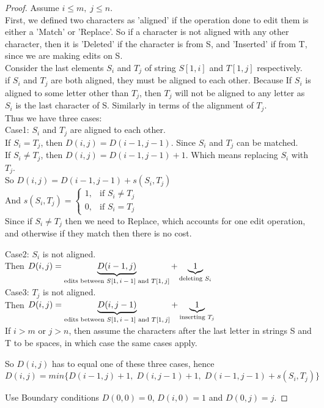 \documentclass{article}
\begin{document}
	\begin{proof}
		Assume $ i \leq m, \; j \leq n $. \\
		
		First, we defined two characters as 'aligned' if the operation done to edit them is either a 'Match' or 'Replace'. So if a character is not aligned with any other character, then it is 'Deleted' if the character is from S, and 'Inserted' if from T, since we are making edits on S.\\
		
		Consider the last elements $ S_i $ and $ T_j $ of string $ S[1, i] $ and $ T[1, j] $ respectively.\\
		if $ S_i $ and $ T_j $ are both aligned, they must be aligned to each other. Because If $ S_i $ is aligned to some letter other than $ T_j $, then $ T_j $ will not be aligned to any letter as $ S_i $ is the last character of S. Similarly in terms of the alignment of $ T_j $.\\
		Thus we have three cases:\\
		
		Case1: $ S_i $ and $ T_j $ are aligned to each other.\\
		If $ S_i = T_j $, then $ D(i, j) = D(i-1, j-1) $. Since $ S_i $ and $ T_j $ can be matched.\\
		If $ S_i \neq T_j $, then $ D(i, j) = D(i-1, j-1) + 1 $. Which means replacing $ S_i $ with $ T_j $.\\
		So $ D(i, j) = D(i-1, j-1) + s(S_i, T_j) $\\
		And $ s(S_i, T_j) = \begin{cases}
			1, & \text{if } S_i \neq T_j\\
			0, & \text{if } S_i = T_j 
		\end{cases}$\\
		Since if $ S_i \neq T_j $ then we need to Replace, which accounts for one edit operation, and otherwise if they match then there is no cost.
		
		Case2: $ S_i $ is not aligned.\\
		Then $ D(i, j) = \underbrace{D(i-1, j)}_\text{edits between $ S[1, i-1] $ and $ T[1, j] $} + \underbrace{1}_\text{deleting $ S_i $} $\\
		
		Case3: $ T_j $ is not aligned.\\
		Then $ D(i, j) = \underbrace{D(i, j-1)}_\text{edits between $ S[1, i-1] $ and $ T[1, j] $} + \underbrace{1}_\text{inserting $ T_j $} $\\
		
		If $ i > m $ or $ j > n $, then assume the characters after the last letter in strings S and T to be spaces, in which case the same cases apply.
		
		So $ D(i, j) $ has to equal one of these three cases, hence $ D(i, j) = min \{D(i-1, j) + 1, \; D(i, j-1) + 1, \; D(i-1, j-1) + s(S_i, T_j)\} $
		
		Use Boundary conditions $ D(0, 0) = 0 $, $ D(i, 0) = 1 $ and $ D(0, j) = j $.
	\end{proof}
\end{document}
